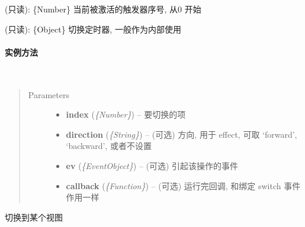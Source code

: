 \documentclass[letterpaper,10pt,english]{sphinxmanual}
\begin{document}

\begin{fulllineitems}
(只读): \{Number\} 当前被激活的触发器序号, 从0 开始

\end{fulllineitems}



\begin{fulllineitems}
\label{api/component/switchable/switchable:Switchable.Switchable.switchTimer}
(只读): \{Object\} 切换定时器, 一般作为内部使用

\end{fulllineitems}



\paragraph{实例方法}
\label{api/component/switchable/switchable:id4}

\begin{fulllineitems}
~\begin{quote}\begin{description}
\item[{Parameters}] \leavevmode\begin{itemize}
\item {}
\textbf{index} (\emph{\{Number\}}) -- 要切换的项

\item {}
\textbf{direction} (\emph{\{String\}}) -- (可选) 方向, 用于 effect, 可取 `forward', `backward', 或者不设置

\item {}
\textbf{ev} (\emph{\{EventObject\}}) -- (可选) 引起该操作的事件

\item {}
\textbf{callback} (\emph{\{Function\}}) -- (可选) 运行完回调, 和绑定 switch 事件作用一样

\end{itemize}

\end{description}\end{quote}

切换到某个视图

\end{fulllineitems}
\end{document}
